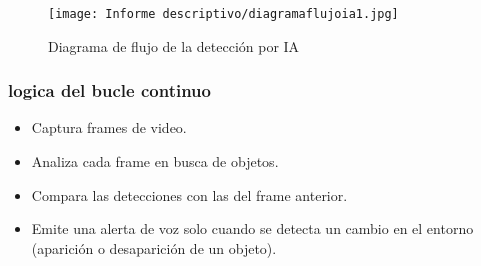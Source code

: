 \documentclass[12pt,a4paper]{article}
\begin{document}
\begin{figure}[H]
\noindent\hspace*{-0.7in}%
\texttt{[image: Informe descriptivo/diagramaflujoia1.jpg]}
\caption{Diagrama de flujo de la detección por IA}
\end{figure}

\subsubsection{logica del bucle continuo}
\begin{itemize}
\item Captura frames de video.
\item Analiza cada frame en busca de objetos.
\item Compara las detecciones con las del frame anterior.
\item Emite una alerta de voz solo cuando se detecta un cambio en el entorno (aparición o desaparición de un objeto).
\end{itemize}
\end{document}
